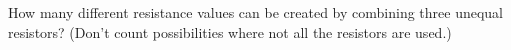 How many different resistance values can be created by
combining three unequal resistors? (Don't count possibilities
where not all the resistors are used.)
